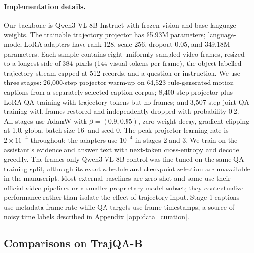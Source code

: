 \paragraph{Implementation details.}
Our backbone is Qwen3-VL-8B-Instruct with frozen vision and base language weights. The trainable trajectory projector has 85.93M parameters; language-model LoRA adapters have rank 128, scale 256, dropout 0.05, and 349.18M parameters. Each sample contains eight uniformly sampled video frames, resized to a longest side of 384 pixels (144 visual tokens per frame), the object-labelled trajectory stream capped at 512 records, and a question or instruction. We use three stages: 26,000-step projector warm-up on 64,523 rule-generated motion captions from a separately selected caption corpus; 8,400-step projector-plus-LoRA QA training with trajectory tokens but no frames; and 3,507-step joint QA training with frames restored and independently dropped with probability 0.2. All stages use AdamW with $\beta=(0.9,0.95)$, zero weight decay, gradient clipping at 1.0, global batch size 16, and seed 0. The peak projector learning rate is $2\times10^{-4}$ throughout; the adapters use $10^{-4}$ in stages 2 and 3. We train on the assistant's evidence and answer text with next-token cross-entropy and decode greedily. The frames-only Qwen3-VL-8B control was fine-tuned on the same QA training split, although its exact schedule and checkpoint selection are unavailable in the manuscript. Most external baselines are zero-shot and some use their official video pipelines or a smaller proprietary-model subset; they contextualize performance rather than isolate the effect of trajectory input. Stage-1 captions use metadata frame rate while QA targets use frame timestamps, a source of noisy time labels described in Appendix~\ref{app:data_curation}.

\subsection{Comparisons on TrajQA-B}
\label{sec:exp-main}

